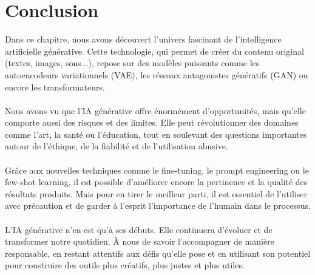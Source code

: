\section*{Conclusion}
Dans ce chapitre, nous avons découvert l'univers fascinant de l'intelligence
artificielle générative. Cette technologie, qui permet de créer du contenu
original (textes, images, sons...), repose sur des modèles puissants comme les
autoencodeurs variationnels (VAE), les réseaux antagonistes génératifs (GAN) ou encore
les transformateurs.
\paragraph{}
Nous avons vu que l'IA générative offre énormément d'opportunités, mais qu’elle
comporte aussi des risques et des limites. Elle peut révolutionner des domaines comme
l'art, la santé ou l'éducation, tout en soulevant des questions importantes autour
de l'éthique, de la fiabilité et de l'utilisation abusive.
\paragraph{}
Grâce aux nouvelles techniques comme le fine-tuning, le prompt engineering ou le
few-shot learning, il est possible d'améliorer encore la pertinence et la
qualité des résultats produits. Mais pour en tirer le meilleur parti, il est
essentiel de l'utiliser avec précaution et de garder à l'esprit l'importance de
l'humain dans le processus.
\paragraph{}
L'IA générative n'en est qu'à ses débuts. Elle continuera d'évoluer et de transformer
notre quotidien. À nous de savoir l’accompagner de manière responsable, en restant
attentifs aux défis qu’elle pose et en utilisant son potentiel pour construire des
outils plus créatifs, plus justes et plus utiles.